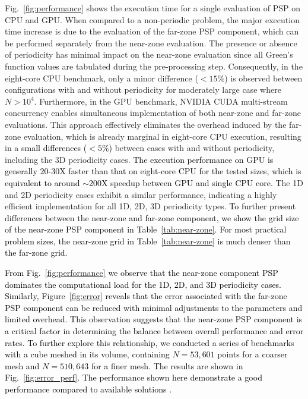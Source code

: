 \documentclass{article}
\begin{document}
Fig.~\ref{fig:performance} shows the execution time for a single evaluation of PSP on CPU and GPU. When compared to a \textcolor{black}{non-periodic} problem, the major execution time increase is due to the evaluation of the far-zone PSP component, which can be performed separately from the near-zone evaluation. The presence or absence of periodicity has minimal impact on the near-zone evaluation since all Green's function values are tabulated during the pre-processing step. Consequently, in the eight-core CPU benchmark, only a minor difference ($< 15\%$) is observed between configurations with and without periodicity for moderately large case where $N > 10^4$. Furthermore, in the GPU benchmark, NVIDIA CUDA multi-stream concurrency enables simultaneous implementation of both near-zone and far-zone evaluations. This approach effectively eliminates the overhead induced by the far-zone evaluation, which is already marginal in eight-core CPU execution, resulting in \textcolor{black}{a small differences ($< 5\%$)} between cases with and without periodicity, including the 3D periodicity cases. \textcolor{black}{The execution performance on GPU is generally 20-30X faster than that on eight-core CPU for the tested sizes, which is equivalent to around $\sim$200X speedup between GPU and single CPU core.} The 1D and 2D periodicity cases exhibit a similar performance, indicating a highly efficient implementation for all 1D, 2D, 3D periodicity types. \textcolor{black}{To further present differences between the near-zone and far-zone component, we show the grid size of the near-zone PSP component in Table~\ref{tab:near-zone}. For most practical problem sizes, the near-zone grid in Table~\ref{tab:near-zone} is much denser than the far-zone grid.}

\textcolor{black}{From Fig.~\ref{fig:performance} we observe that the near-zone component PSP dominates the computational load for the 1D, 2D, and 3D periodicity cases. Similarly, Figure~\ref{fig:error} reveals that the error associated with the far-zone PSP component can be reduced with minimal adjustments to the parameters and limited overhead. This observation suggests that the near-zone PSP component is a critical factor in determining the balance between overall performance and error rates. To further explore this relationship, we conducted a series of benchmarks with a cube meshed in its volume, containing $N=53,601$ points for a coarser mesh and $N=510,643$ for a finer mesh. The results are shown in Fig.~\ref{fig:error_perf}. The performance shown here demonstrate a good performance compared to available solutions \cite{r1_2}.}
\end{document}
